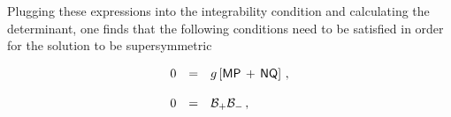 \documentclass[12pt,a4paper]{article}
\begin{document}

Plugging these expressions into the integrability condition and
calculating the determinant, one finds that the following conditions
need to be satisfied in order for the solution to be supersymmetric

\begin{equation}
\begin{array}{rcl}
0 &=& g\left[ \mathsf{M}\mathsf{P}\,+\,\mathsf{N}\mathsf{Q}\right] \, ,\\
& & \\
0 &=& {\cal B}_{+}{\cal B}_{-}\, ,\\
\end{array}
\end{equation}
\end{document}
